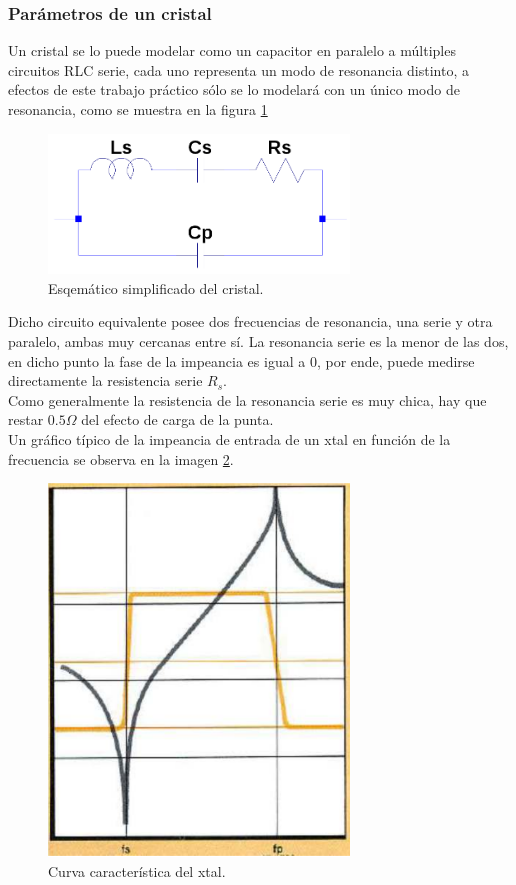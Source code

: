 \documentclass[a4paper,10pt]{article}
\begin{document}
		\subsubsection{Par\'ametros de un cristal}	
		
		\indent Un cristal se lo puede modelar como un capacitor en paralelo a 
		múltiples circuitos RLC serie, cada uno representa un modo de resonancia
		distinto, a efectos de este trabajo práctico sólo se lo modelará con un 
		único modo de resonancia, como se muestra en la figura \ref{img004}

		\begin{figure}[!htb]
			\centering
			\includegraphics[width=8cm]{Imagenes/esqXtal.png}
			\caption{Esqemático simplificado del cristal.}
			\label{img004} 
		\end{figure}

		\indent Dicho circuito equivalente posee dos frecuencias de resonancia,
		una serie y otra paralelo, ambas muy cercanas entre sí. La resonancia 
		serie es la menor de las dos, en dicho punto la fase de la impeancia es
		igual a 0, por ende, puede medirse directamente la resistencia serie 
		$R_s$. \\
		\indent Como generalmente la resistencia de la resonancia serie es muy 
		chica, hay que restar $0.5\Omega$ del efecto de carga de la punta. \\
		\indent Un gráfico típico de la impeancia de entrada de un xtal en 
		función de la frecuencia se observa en la imagen \ref{img005}.
		
		\begin{figure}[!htb]
			\centering
			\includegraphics[width=8cm]{Imagenes/curvaCaractXtal.png}
			\caption{Curva característica del xtal.}
			\label{img005} 
		\end{figure}
\end{document}
